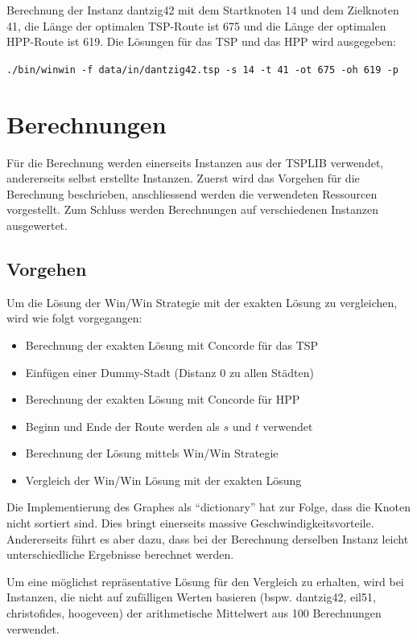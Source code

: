\documentclass[11pt,a4paper]{article}
\begin{document}
Berechnung der Instanz dantzig42 mit dem Startknoten 14 und dem Zielknoten 41, die Länge der optimalen TSP-Route ist 675 und die Länge der optimalen HPP-Route ist 619. Die Lösungen für das TSP und das HPP wird ausgegeben:
\begin{flushleft}
\texttt{./bin/winwin -f data/in/dantzig42.tsp -s 14 -t 41 -ot 675 -oh 619 -p}
\end{flushleft}

\section{Berechnungen}
Für die Berechnung werden einerseits Instanzen aus der TSPLIB verwendet, andererseits selbst erstellte Instanzen.
Zuerst wird das Vorgehen für die Berechnung beschrieben, anschliessend werden die verwendeten Ressourcen vorgestellt. Zum Schluss werden Berechnungen auf verschiedenen Instanzen ausgewertet.

\subsection{Vorgehen}
Um die Lösung der Win/Win Strategie mit der exakten Lösung zu vergleichen, wird wie folgt vorgegangen:

\begin{itemize}
    \item Berechnung der exakten Lösung mit Concorde für das TSP 
    \item Einfügen einer Dummy-Stadt (Distanz 0 zu allen Städten)
    \item Berechnung der exakten Lösung mit Concorde für HPP 
    \item Beginn und Ende der Route werden als $s$ und $t$ verwendet
    \item Berechnung der Lösung mittels Win/Win Strategie
    \item Vergleich der Win/Win Lösung mit der exakten Lösung
\end{itemize}

Die Implementierung des Graphes als "`dictionary"' hat zur Folge, dass die Knoten nicht sortiert sind. Dies bringt einerseits massive Geschwindigkeitsvorteile. Andererseits führt es aber dazu, dass bei der Berechnung derselben Instanz leicht unterschiedliche Ergebnisse berechnet werden.

Um eine möglichst repräsentative Lösung für den Vergleich zu erhalten, wird bei Instanzen, die nicht auf zufälligen Werten basieren (bspw. dantzig42, eil51, christofides, hoogeveen) der arithmetische Mittelwert aus 100 Berechnungen verwendet.
\end{document}

